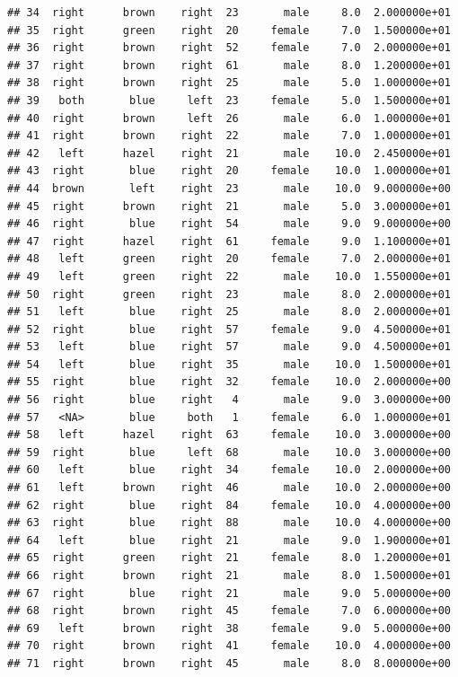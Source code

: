 \documentclass[]{article}
\begin{document}
\begin{verbatim}
## 34  right      brown    right  23       male     8.0  2.000000e+01
## 35  right      green    right  20     female     7.0  1.500000e+01
## 36  right      brown    right  52     female     7.0  2.000000e+01
## 37  right      brown    right  61       male     8.0  1.200000e+01
## 38  right      brown    right  25       male     5.0  1.000000e+01
## 39   both       blue     left  23     female     5.0  1.500000e+01
## 40  right      brown     left  26       male     6.0  1.000000e+01
## 41  right      brown    right  22       male     7.0  1.000000e+01
## 42   left      hazel    right  21       male    10.0  2.450000e+01
## 43  right       blue    right  20     female    10.0  1.000000e+01
## 44  brown       left    right  23       male    10.0  9.000000e+00
## 45  right      brown    right  21       male     5.0  3.000000e+01
## 46  right       blue    right  54       male     9.0  9.000000e+00
## 47  right      hazel    right  61     female     9.0  1.100000e+01
## 48   left      green    right  20     female     7.0  2.000000e+01
## 49   left      green    right  22       male    10.0  1.550000e+01
## 50  right      green    right  23       male     8.0  2.000000e+01
## 51   left       blue    right  25       male     8.0  2.000000e+01
## 52  right       blue    right  57     female     9.0  4.500000e+01
## 53   left       blue    right  57       male     9.0  4.500000e+01
## 54   left       blue    right  35       male    10.0  1.500000e+01
## 55  right       blue    right  32     female    10.0  2.000000e+00
## 56  right       blue    right   4       male     9.0  3.000000e+00
## 57   <NA>       blue     both   1     female     6.0  1.000000e+01
## 58   left      hazel    right  63     female    10.0  3.000000e+00
## 59  right       blue     left  68       male    10.0  3.000000e+00
## 60   left       blue    right  34     female    10.0  2.000000e+00
## 61   left      brown    right  46       male    10.0  2.000000e+00
## 62  right       blue    right  84     female    10.0  4.000000e+00
## 63  right       blue    right  88       male    10.0  4.000000e+00
## 64   left       blue    right  21       male     9.0  1.900000e+01
## 65  right      green    right  21     female     8.0  1.200000e+01
## 66  right      brown    right  21       male     8.0  1.500000e+01
## 67  right       blue    right  21       male     9.0  5.000000e+00
## 68  right      brown    right  45     female     7.0  6.000000e+00
## 69   left      brown    right  38     female     9.0  5.000000e+00
## 70  right      brown    right  41     female    10.0  4.000000e+00
## 71  right      brown    right  45       male     8.0  8.000000e+00

\end{verbatim}
\end{document}
